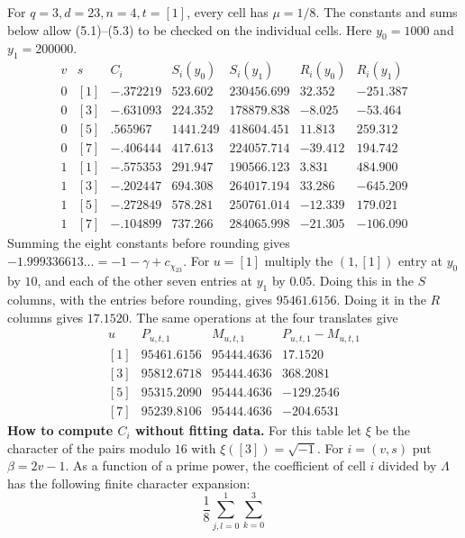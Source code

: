 \documentclass[11pt,letterpaper]{article}
\begin{document}
{For $q=3,d=23,n=4,t=[1]$, every cell has $\mu=1/8$. The constants and sums below allow (5.1)--(5.3) to be checked on the individual cells. Here $y_0=1000$ and $y_1=200000$.
\begin{equation}\label{D:64}
 \begin{array}{cc|r|rr|rr}
 v&s&C_i&S_i(y_0)&S_i(y_1)&R_i(y_0)&R_i(y_1)\\ \hline
 0&[1]&-.372219&523.602&230456.699&32.352&-251.387\\
 0&[3]&-.631093&224.352&178879.838&-8.025&-53.464\\
 0&[5]& .565967&1441.249&418604.451&11.813&259.312\\
 0&[7]&-.406444&417.613&224057.714&-39.412&194.742\\
 1&[1]&-.575353&291.947&190566.123&3.831&484.900\\
 1&[3]&-.202447&694.308&264017.194&33.286&-645.209\\
 1&[5]&-.272849&578.281&250761.014&-12.339&179.021\\
 1&[7]&-.104899&737.266&284065.998&-21.305&-106.090
 \end{array}
\end{equation}
Summing the eight constants before rounding gives $-1.999336613\ldots=-1-\gamma+c_{\chi_{23}}$. For $u=[1]$ multiply the $(1,[1])$ entry at $y_0$ by $10$, and each of the other seven entries at $y_1$ by $0.05$. Doing this in the $S$ columns, with the entries before rounding, gives $95461.6156$. Doing it in the $R$ columns gives $17.1520$. The same operations at the four translates give
\begin{equation}\label{D:65}
 \begin{array}{c|rrr}
 u&P_{u,t,1}&M_{u,t,1}&P_{u,t,1}-M_{u,t,1}\\ \hline
 {[1]}&95461.6156&95444.4636&17.1520\\
 {[3]}&95812.6718&95444.4636&368.2081\\
 {[5]}&95315.2090&95444.4636&-129.2546\\
 {[7]}&95239.8106&95444.4636&-204.6531
 \end{array}
\end{equation}
\textbf{How to compute $C_i$ without fitting data.} For this table let $\xi$ be the character of the pairs modulo $16$ with $\xi([3])=\sqrt{-1}$. For $i=(v,s)$ put $\beta=2v-1$. As a function of a prime power, the coefficient of cell $i$ divided by $\Lambda$ has the following finite character expansion:
\begin{equation}\label{D:66}
 \frac18\sum_{j,l=0}^1\sum_{k=0}^3

\end{equation}}
\end{document}
